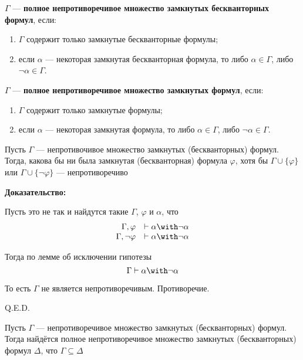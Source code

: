  $\Gamma$ --- \textbf{полное непротиворечивое множество замкнутых бескванторных формул},
если:
\begin{enumerate}
\item $\Gamma$ содержит только замкнутые бескванторные формулы;
\item если $\alpha$ --- некоторая замкнутая бескванторная формула, то либо $\alpha\in\Gamma$, либо $\neg\alpha\in\Gamma$.
\end{enumerate}


 $\Gamma$ --- \textbf{полное непротиворечивое множество замкнутых формул}, если:
\begin{enumerate}
\item $\Gamma$ содержит только замкнутые формулы;
\item если $\alpha$ --- некоторая замкнутая формула, то либо $\alpha \in \Gamma$, либо $\neg\alpha \in \Gamma$.
\end{enumerate}



Пусть $\Gamma$ --- непротивочивое множество замкнутых (бескванторных) формул. Тогда, какова бы ни была
замкнутая (бескванторная) формула $\varphi$, хотя бы $\Gamma \cup \{\varphi\}$ или $\Gamma \cup \{\neg\varphi\}$ ---
непротиворечиво

\textbf{Доказательство:}

Пусть это не так и найдутся такие $\Gamma$, $\varphi$ и $\alpha$, что
 $$\begin{array}{rl}\Gamma,\varphi & \vdash \alpha\with\neg\alpha\\
                    \Gamma,\neg\varphi & \vdash \alpha \with\neg\alpha\end{array}$$

Тогда по лемме об исключении гипотезы
$$\Gamma\vdash \alpha\with\neg\alpha$$

То есть $\Gamma$ не является непротиворечивым. Противоречие.

\hfill Q.E.D.


Пусть $\Gamma$ --- непротиворечивое множество замкнутых (бескванторных) формул. Тогда
найдётся полное непротиворечивое множество замкнутых (бескванторных) формул $\Delta$, что
$\Gamma \subseteq \Delta$

